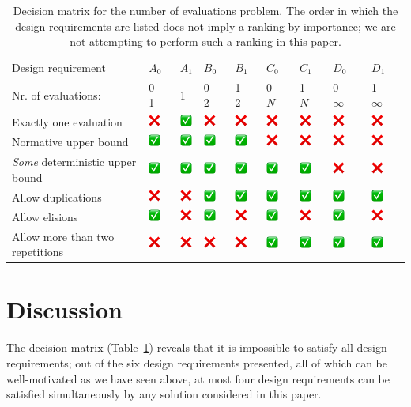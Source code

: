 \newcommand{\yes}{\includegraphics[width=4mm]{images/yes.png}}
\newcommand{\no}{\includegraphics[width=4mm]{images/no.png}}
\begin{table}%
\begin{tabular}{|p{5.4cm}|p{0.9cm}|p{0.9cm}|p{0.9cm}|p{0.9cm}|p{0.9cm}|p{0.9cm}|p{0.9cm}|p{0.9cm}|}
\hline 
Design requirement & $A_0$ & $A_1$ & $B_0$ & $B_1$ & $C_0$ & $C_1$ & $D_0$ & $D_1$ \\
\phantom{xxxxxxxxxxxi}Nr. of evaluations:& 0 -- 1 & 1 & 0 -- 2& 1 -- 2 & 0 -- $N$ & 1 -- $N$ & \mbox{0 -- $\infty$} & \mbox{1 -- $\infty$} \\
\hline
Exactly one evaluation& \no & \yes & \no & \no & \no & \no & \no & \no \\
\hline
Normative upper bound & \yes & \yes & \yes & \yes & \no & \no & \no & \no \\
\hline
\emph{Some} deterministic upper bound & \yes & \yes & \yes & \yes & \yes & \yes & \no & \no \\
\hline
Allow duplications & \no & \no & \yes & \yes  & \yes & \yes & \yes & \yes \\
\hline
Allow elisions & \yes & \no & \yes & \no & \yes & \no & \yes & \no \\
\hline
Allow more than two repetitions& \no & \no & \no & \no & \yes & \yes & \yes & \yes \\
\hline
\end{tabular}
\caption{Decision matrix for the number of evaluations problem. The order in which the design requirements are listed does not imply a ranking by importance; we are not attempting to perform such a ranking in this paper.}
  \label{table:matrix}
\end{table}



\section{Discussion}

The decision matrix (Table~\ref{table:matrix}) reveals that it is impossible to satisfy all design requirements; out of the six design requirements presented, all of which can be well-motivated as we have seen above, at most four design requirements can be satisfied simultaneously by any solution considered in this paper.

